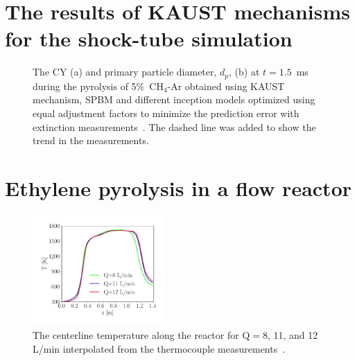 \section{The results of KAUST mechanisms for the shock-tube simulation}

\begin{figure}[H]
	\centering
	\caption{The CY (a) and primary particle diameter, $d_p$, (b) at $t=1.5$~ms during the pyrolysis of 5\%~$\mathrm{CH_4}$-Ar obtained using KAUST mechanism, SPBM and different inception models optimized using equal adjustment factors to minimize the prediction error with extinction measurements~\citep{agafonov2016unified}. The dashed line was added to show the trend in the measurements.}
	\label{fig:shockagof_yield_dp_cpr_kaust} 
\end{figure}

\section{Ethylene pyrolysis in a flow reactor}


\begin{figure}[H]
	\centering
	\includegraphics[width=0.45\textwidth]{Figures/Results/PFR/temperature_combined.pdf}
	\caption{The centerline temperature along the reactor for $\mathrm{Q}=8$, 11, and 12 L/min interpolated from the thermocouple measurements~\citep{mei2019quantitative}.}
	\label{fig:pfr_temp} 
\end{figure}



